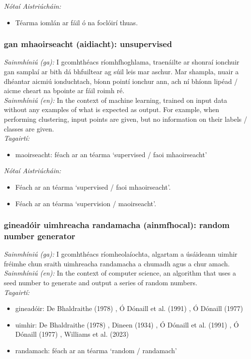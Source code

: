  \noindent \textit{Nótaí Aistriúcháin:}
\begin{itemize}
	\item Téarma iomlán ar fáil ó na foclóirí thuas.
\end{itemize}


\subsubsection*{gan mhaoirseacht (aidiacht): unsupervised}
 \noindent \textit{Sainmhíniú (ga):} I gcomhthéacs ríomhfhoghlama, traenáilte ar shonraí ionchuir gan samplaí ar bith dá bhfuiltear ag súil leis mar aschur. Mar shampla, nuair a dhéantar aicmiú ionduchtach, bíonn pointí ionchur ann, ach ní bhíonn lipéad / aicme cheart na bpointe ar fáil roimh ré.
\\
 \noindent \textit{Sainmhíniú (en):} In the context of machine learning, trained on input data without any examples of what is expected as output. For example, when performing clustering, input points are given, but no information on their labels / classes are given.
\\
 \noindent \textit{Tagairtí:}
\begin{itemize}
	\item maoirseacht: féach ar an téarma `supervised / faoi mhaoirseacht'
\end{itemize}

 \noindent \textit{Nótaí Aistriúcháin:}
\begin{itemize}
	\item Féach ar an téarma `supervised / faoi mhaoirseacht'.
	\item Féach ar an téarma `supervision / maoirseacht'.
\end{itemize}


\subsubsection*{gineadóir uimhreacha randamacha (ainmfhocal): random number generator}
 \noindent \textit{Sainmhíniú (ga):} I gcomhthéacs ríomheolaíochta, algartam a úsáideann uimhir fréimhe chun sraith uimhreacha randamacha a chumadh agus a chur amach.
\\
 \noindent \textit{Sainmhíniú (en):} In the context of computer science, an algorithm that uses a seed number to generate and output a series of random numbers.
\\
 \noindent \textit{Tagairtí:}
\begin{itemize}
	\item gineadóir: De Bhaldraithe (1978) \cite{de-bhaldraithe}, Ó Dónaill et al. (1991) \cite{focloir-beag}, Ó Dónaill (1977) \cite{odonaill}
	\item uimhir: De Bhaldraithe (1978) \cite{de-bhaldraithe}, Dineen (1934) \cite{dineen}, Ó Dónaill et al. (1991) \cite{focloir-beag}, Ó Dónaill (1977) \cite{odonaill}, Williams et al. (2023) \cite{storchiste}
	\item randamach: féach ar an téarma `random / randamach'
\end{itemize}

